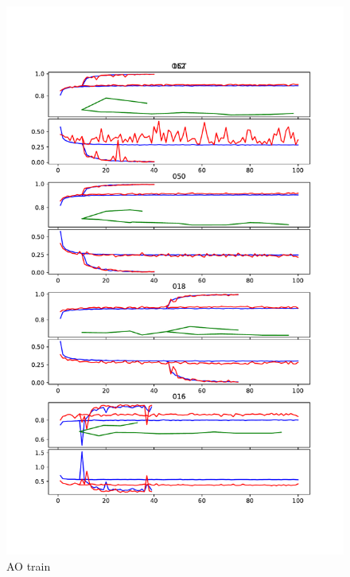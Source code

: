 \documentclass{article}
\begin{document}
			\begin{figure}[htbp]
				\centering
				\includegraphics[width=\linewidth]{Figs/abnormity_OCT_loss_and_acc.pdf}
				\caption{AO train}
				\vspace{0.3cm}
				\label{fig:AO_train}
			\end{figure}
			
\end{document}
